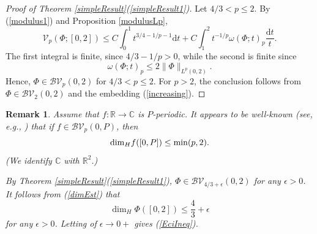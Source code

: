 \documentclass{amsart}
\newtheorem{rem}[theorem]{Remark}
\numberwithin{equation}{section}
\begin{document}
\begin{proof}[Proof of Theorem \ref{simpleResult}(\ref{simpleResult1})]
    Let $4/3<p\le 2$. By (\ref{modulus1}) and Proposition \ref{modulusLp}, 
    \begin{equation}
        \nonumber
        \mathcal{V}_p(\Phi;[0,2])\le C\int_0^1t^{3/4-1/p-1}\mathrm{d}t+C\int_1^2t^{-1/p}\omega(\Phi;t)_p\frac{\mathrm{d}t}{t}.
    \end{equation}
    The first integral is finite, since $4/3-1/p>0$, while the second is finite since
    \begin{equation}
        \nonumber
        \omega(\Phi;t)_p\le 2\|\Phi\|_{L^p(0,2)}.
    \end{equation}
    Hence, $\Phi\in\mathcal{BV}_p(0,2)$ for $4/3<p\le2$. For $p>2$, the conclusion follows from $\Phi\in\mathcal{BV}_2(0,2)$ and the embedding (\ref{increasing}).
\end{proof}

\begin{rem}
    \label{Eceizabarrena}
    Assume that $f:\mathbb{R}\rightarrow\mathbb{C}$ is $P$-periodic. It appears to be well-known (see, e.g., \cite[Eq. (9)]{Ya18}) that if  $f\in\mathcal{BV}_p(0,P)$, then
    \begin{equation}
    \label{dimEst}
    {\rm dim}_Hf([0,P])\le\min(p,2).
    \end{equation}
    (We identify $\mathbb{C}$ with $\mathbb{R}^2$.)
    
    By Theorem \ref{simpleResult}(\ref{simpleResult1}), $\Phi\in\mathcal{BV}_{4/3+\epsilon}(0,2)$ for any $\epsilon>0$. It follows from (\ref{dimEst}) that
    \begin{equation}
        \nonumber
        \dim_H\Phi([0,2])\le \frac{4}{3}+\epsilon
    \end{equation}
    for any $\epsilon>0$. Letting of $\epsilon\rightarrow0+$ gives (\ref{EciIneq}).
\end{rem}









\end{document}
